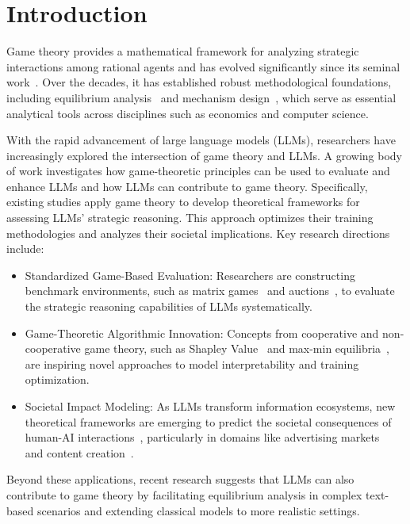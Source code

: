 \section{Introduction} 

Game theory provides a mathematical framework for analyzing strategic interactions among rational agents and has evolved significantly since its seminal work~\cite{von2007theory}. 
Over the decades, it has established robust methodological foundations, including equilibrium analysis~\cite{nash1950equilibrium} and mechanism design~\cite{vickrey1961counterspeculation}, which serve as essential analytical tools across disciplines such as economics and computer science.

With the rapid advancement of large language models (LLMs), researchers have increasingly explored the intersection of game theory and LLMs.
A growing body of work investigates how game-theoretic principles can be used to evaluate and enhance LLMs and how LLMs can contribute to game theory. 
Specifically, existing studies apply game theory to develop theoretical frameworks for assessing LLMs' strategic reasoning. 
This approach optimizes their training methodologies and analyzes their societal implications. 
Key research directions include:
\begin{itemize}
    \item Standardized Game-Based Evaluation: Researchers are constructing benchmark environments, such as matrix games~\cite{akata2023playing} and auctions~\cite{chen2023put}, to evaluate the strategic reasoning capabilities of LLMs systematically.
    \item Game-Theoretic Algorithmic Innovation: Concepts from cooperative and non-cooperative game theory, such as Shapley Value~\cite{enouen2023textgenshap} and max-min equilibria~\cite{NLHF}, are inspiring novel approaches to model interpretability and training optimization.
    \item Societal Impact Modeling: As LLMs transform information ecosystems, new theoretical frameworks are emerging to predict the societal consequences of human-AI interactions~\cite{yaohuman}, particularly in domains like advertising markets~\cite{duetting2024mechanism} and content creation~\cite{fish2023generative}.
\end{itemize}
Beyond these applications, recent research suggests that LLMs can also contribute to game theory by facilitating equilibrium analysis in complex text-based scenarios and extending classical models to more realistic settings.

